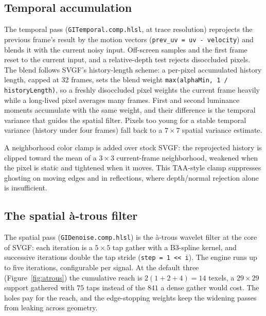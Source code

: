 \subsection{Temporal accumulation}

The temporal pass (\texttt{GITemporal.comp.hlsl}, at trace resolution) reprojects the previous
frame's result by the motion vectors (\texttt{prev_uv = uv - velocity}) and blends it with the
current noisy input. Off-screen samples and the first frame reset to the current input, and a
relative-depth test rejects disoccluded pixels. The blend follows SVGF's history-length scheme: a
per-pixel accumulated history length, capped at 32 frames, sets the blend weight
\texttt{max(alphaMin, 1 / historyLength)}, so a freshly disoccluded pixel weights the current frame
heavily while a long-lived pixel averages many frames. First and second luminance moments accumulate
with the same weight, and their difference is the temporal variance that guides the spatial filter.
Pixels too young for a stable temporal variance (history under four frames) fall back to a
$7\times7$ spatial variance estimate.

A neighborhood color clamp is added over stock SVGF: the reprojected history is clipped toward the
mean of a $3\times3$ current-frame neighborhood, weakened when the pixel is static and tightened when
it moves. This TAA-style clamp suppresses ghosting on moving edges and in reflections, where
depth/normal rejection alone is insufficient.

\subsection{The spatial \`a-trous filter}

The spatial pass (\texttt{GIDenoise.comp.hlsl}) is the \`a-trous wavelet filter at the core of SVGF:
each iteration is a $5\times5$ tap gather with a B3-spline kernel, and successive iterations double
the tap stride (\texttt{step = 1 << i}). The engine runs up to five iterations, configurable per
signal. At the default three (Figure~\ref{fig:atrous}) the cumulative reach is $2(1+2+4) = 14$ texels,
a $29\times29$ support gathered with $75$ taps instead of the $841$ a dense gather would cost. The
holes pay for the reach, and the edge-stopping weights keep the widening passes from leaking across
geometry.

